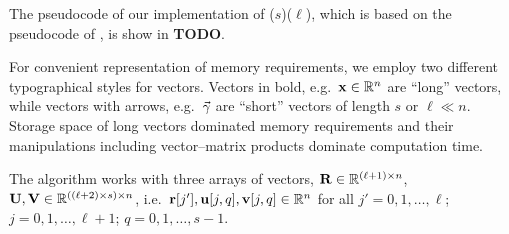 The pseudocode of our implementation of
($s$)($\ell$), which is based on the
pseudocode of \citet{sleijpen2010exploiting}, is show in
\textbf{TODO}.

For convenient representation of memory requirements, we employ two
different typographical styles for vectors. Vectors in bold,
e.g.~$\bm{\mathrm{x}} \in \mathbb{R}^n$ are ``long'' vectors, while vectors with
arrows, e.g.~$\vecarrow{\gamma}$ are ``short'' vectors of length $s$
or $\ell \ll n$. Storage space of long vectors dominated memory
requirements and their manipulations including vector--matrix products
dominate computation time.

The algorithm works with three arrays of vectors,
$\bm{\mathrm{R}} \in \mathbb{R}^{(\ell + 1) \times n}$,
$\bm{\mathrm{U}}, \bm{\mathrm{V}} \in \mathbb{R}^{((\ell + 2) \times s) \times n}$,
i.e.~$\bm{\mathrm{r}}[j'], \bm{\mathrm{u}}[j, q], \bm{\mathrm{v}}[j, q] \in \mathbb{R}^n$ for all
$j' = 0, 1, \ldots, \ell$; $j = 0, 1, \ldots, \ell + 1$;
$q = 0, 1, \ldots, s - 1$.

